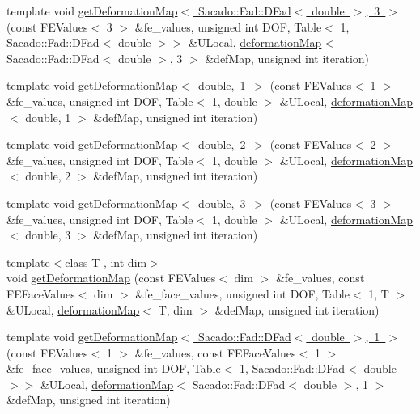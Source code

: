 \begin{DoxyCompactItemize}
\item 
template void \mbox{\hyperlink{function_evaluations_8cc_aed838368af3e1f968a4234eb18bee8e8}{get\+Deformation\+Map$<$ Sacado\+::\+Fad\+::\+D\+Fad$<$ double $>$, 3 $>$}} (const F\+E\+Values$<$ 3 $>$ \&fe\+\_\+values, unsigned int D\+OF, Table$<$ 1, Sacado\+::\+Fad\+::\+D\+Fad$<$ double $>$$>$ \&U\+Local, \mbox{\hyperlink{structdeformation_map}{deformation\+Map}}$<$ Sacado\+::\+Fad\+::\+D\+Fad$<$ double $>$, 3 $>$ \&def\+Map, unsigned int iteration)
\item 
template void \mbox{\hyperlink{function_evaluations_8cc_a4e726f8c8f17b338819f30946e6d4274}{get\+Deformation\+Map$<$ double, 1 $>$}} (const F\+E\+Values$<$ 1 $>$ \&fe\+\_\+values, unsigned int D\+OF, Table$<$ 1, double $>$ \&U\+Local, \mbox{\hyperlink{structdeformation_map}{deformation\+Map}}$<$ double, 1 $>$ \&def\+Map, unsigned int iteration)
\item 
template void \mbox{\hyperlink{function_evaluations_8cc_a934f34bca13586e71d79d67e2d405170}{get\+Deformation\+Map$<$ double, 2 $>$}} (const F\+E\+Values$<$ 2 $>$ \&fe\+\_\+values, unsigned int D\+OF, Table$<$ 1, double $>$ \&U\+Local, \mbox{\hyperlink{structdeformation_map}{deformation\+Map}}$<$ double, 2 $>$ \&def\+Map, unsigned int iteration)
\item 
template void \mbox{\hyperlink{function_evaluations_8cc_a9d25cc478ac60031a64a48a1687fabc2}{get\+Deformation\+Map$<$ double, 3 $>$}} (const F\+E\+Values$<$ 3 $>$ \&fe\+\_\+values, unsigned int D\+OF, Table$<$ 1, double $>$ \&U\+Local, \mbox{\hyperlink{structdeformation_map}{deformation\+Map}}$<$ double, 3 $>$ \&def\+Map, unsigned int iteration)
\item 
{\footnotesize template$<$class T , int dim$>$ }\\void \mbox{\hyperlink{group___evaluation_functions_ga239b206235603af9482484c29c8d57ea}{get\+Deformation\+Map}} (const F\+E\+Values$<$ dim $>$ \&fe\+\_\+values, const F\+E\+Face\+Values$<$ dim $>$ \&fe\+\_\+face\+\_\+values, unsigned int D\+OF, Table$<$ 1, T $>$ \&U\+Local, \mbox{\hyperlink{structdeformation_map}{deformation\+Map}}$<$ T, dim $>$ \&def\+Map, unsigned int iteration)
\item 
template void \mbox{\hyperlink{function_evaluations_8cc_ae3b81f1c251c883431db31f41eb1c340}{get\+Deformation\+Map$<$ Sacado\+::\+Fad\+::\+D\+Fad$<$ double $>$, 1 $>$}} (const F\+E\+Values$<$ 1 $>$ \&fe\+\_\+values, const F\+E\+Face\+Values$<$ 1 $>$ \&fe\+\_\+face\+\_\+values, unsigned int D\+OF, Table$<$ 1, Sacado\+::\+Fad\+::\+D\+Fad$<$ double $>$$>$ \&U\+Local, \mbox{\hyperlink{structdeformation_map}{deformation\+Map}}$<$ Sacado\+::\+Fad\+::\+D\+Fad$<$ double $>$, 1 $>$ \&def\+Map, unsigned int iteration)

\end{DoxyCompactItemize}
